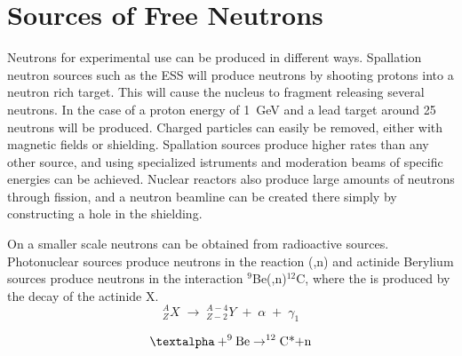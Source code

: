 \documentclass[main.tex]{subfiles}
\begin{document}


\section{Sources of Free Neutrons}
Neutrons for experimental use can be produced in different ways. Spallation neutron sources such as the ESS will produce neutrons by shooting protons into a neutron rich target. This will cause the nucleus to fragment releasing several neutrons. In the case of a proton energy of \SI{1}{\GeV} and a lead target around 25 neutrons will be produced\cite[pg.46]{Tavernier}. Charged particles can easily be removed, either with magnetic fields or shielding. Spallation sources produce higher rates than any other source, and using specialized istruments and moderation beams of specific energies can be achieved. Nuclear reactors also produce large amounts of neutrons through fission, and a neutron beamline can be created there simply by constructing a hole in the shielding\cite[446]{Krane}. 

On a smaller scale neutrons can be obtained from radioactive sources. Photonuclear sources produce neutrons in the reaction (\textgamma ,n) and actinide Berylium sources produce neutrons in the interaction $^\text{9}$Be(\textalpha,n)$^\text{12}$C, where the \textalpha\;is produced by the decay of the actinide X\cite[pg.8]{Leo}.
\begin{equation}
	^A_ZX\;\rightarrow\;^{A-4}_{Z-2}Y\;+\;\alpha\;+\;\gamma_1
	\label{eq:actinide}
\end{equation}

\begin{equation}
	\text{\textalpha}+^\text{9}\text{Be}\rightarrow^\text{12}\text{C*+n}
\end{equation}
\end{document}
